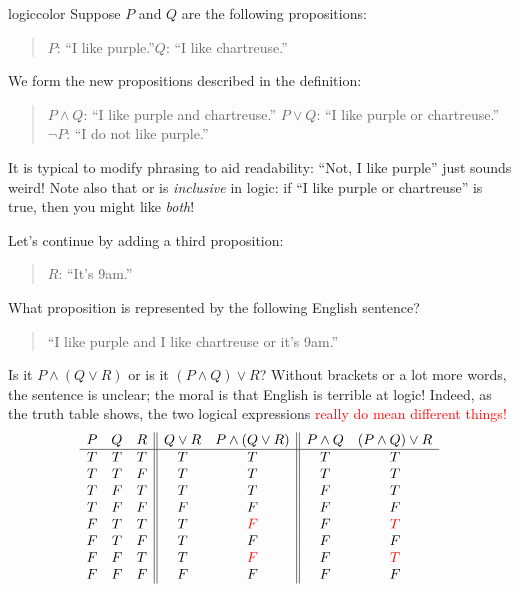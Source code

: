 \begin{example}{}{logiccolor}
	Suppose $P$ and $Q$ are the following propositions:
	\begin{quote}
		$P$: ``I like purple.''\qquad\qquad $Q$: ``I like chartreuse.''
	\end{quote}
	We form the new propositions described in the definition:
	\begin{quote}
		$P\wedge Q$: ``I like purple and chartreuse.''\qquad \qquad
		$P\vee Q$: ``I like purple or chartreuse.''\smallbreak
		$\neg P$: ``I do not like purple.''
	\end{quote}
	It is typical to modify phrasing to aid readability: ``Not, I like purple'' just sounds weird! Note also that or is \emph{inclusive} in logic: if ``I like purple or chartreuse'' is true, then you might like \emph{both}!\medbreak
	
	Let's continue by adding a third proposition:
	\begin{quote}
		$R$: ``It's 9am.''
	\end{quote}
	What proposition is represented by the following English sentence?
	\begin{quote}
		``I like purple and I like chartreuse or it's 9am.''
	\end{quote}
	Is it $P\wedge(Q\vee R)$ or is it $(P\wedge Q)\vee R$? Without brackets or a lot more words, the sentence is unclear; the moral is that English is terrible at logic! Indeed, as the truth table shows, the two logical expressions \textcolor{red}{really do mean different things!}\vspace{-1pt}
	 \[
	 \begin{array}{ccc||cc||cc}
			P & Q & R & Q\vee R & P\wedge (Q\vee R) & P\wedge Q & (P \wedge Q)\vee R\\\hline
			T & T & T & T & T & T & T\\
			T & T & F & T & T & T & T\\
			T & F & T & T & T & F & T\\
			T & F & F & F & F & F & F\\
			F & T & T & T & \textcolor{red}{F} & F & \textcolor{red}{T}\\
			F & T & F & T & F & F & F\\
			F & F & T & T & \textcolor{red}{F} & F & \textcolor{red}{T}\\
			F & F & F & F & F & F & F
		\end{array}
	 \]
\end{example}



